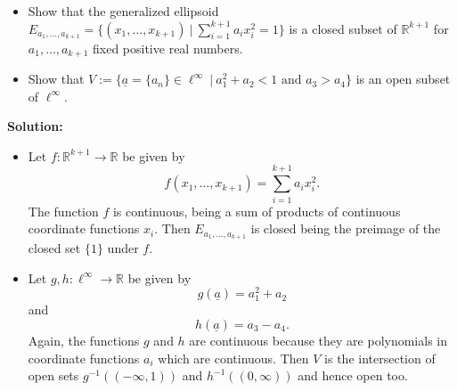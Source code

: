 \documentclass[12pt]{article}
\newcommand\bi{\begin{itemize}}
\newcommand\ei{\end{itemize}}
\newcommand\itema{\item[(a)]}
\newcommand\itemb{\item[(b)]}
\renewcommand\|{\ | \ }
\newcommand\ra{\rightarrow}
\newcommand\R{\mathbb{R}}
\def\sol{\textbf{Solution:}}
\begin{document}
\bi
\itema
Show that the generalized ellipsoid 
$
E_{a_1,\ldots, a_{k + 1}} = \{(x_1, \ldots, x_{k + 1}) \|
\sum_{i = 1}^{k + 1} a_i x_i^2 = 1 \}
$
is a closed subset of $\R^{k+1}$ for $a_1, \ldots, a_{k + 1}$ fixed positive
real numbers.
\itemb
Show that 
$
V := \{\underline a = \{ a_n\} \in \ell^\infty \|
a_1^2 + a_2 < 1 \text{ and } a_3 > a_4
\}
$
is an open subset of $\ell^\infty$.
\ei


\sol

\bi
\itema
Let $f: \R^{k + 1} \ra \R$ be given by 
\[
f(x_1, \ldots, x_{k + 1}) = \sum_{i = 1}^{k + 1} a_i x_i^2.
\]
The function $f$ is continuous, being a sum of products of continuous 
coordinate functions $x_i$. Then $E_{a_1,\ldots, a_{k + 1}}$ is closed
being the preimage of the closed set $\{1\}$ under $f$.
\itemb
Let $g, h: \ell^\infty \ra \R$ be given by
\[
g(\underline a) = a_1^2 + a_2
\]
and 
\[
h(\underline a) = a_3 - a_4.
\]
Again, the functions $g$ and $h$ are continuous because they are polynomials
in coordinate functions $a_i$ which are continuous. 
Then $V$ is the intersection of open sets $g^{-1}((-\infty, 1))$ and
$h^{-1}((0, \infty))$ and hence open too.
\ei
\end{document}
